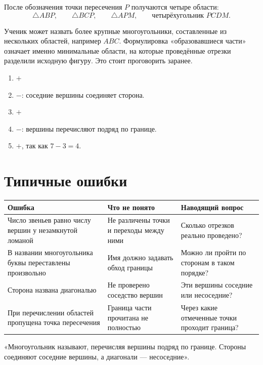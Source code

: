 \begin{thinkbox}
  После обозначения точки пересечения \(P\) получаются четыре области:
  \[
    \triangle ABP,\qquad \triangle BCP,\qquad \triangle APM,
    \qquad \text{четырёхугольник }PCDM.
  \]
\end{thinkbox}

\begin{teacherbox}
  Ученик может назвать более крупные многоугольники, составленные из
  нескольких областей, например \(ABC\). Формулировка «образовавшиеся
  части» означает именно минимальные области, на которые проведённые
  отрезки разделили исходную фигуру. Это стоит проговорить заранее.
\end{teacherbox}

\begin{checkpointbox}
  \begin{enumerate}[label=\alph*),itemsep=0.4em]
    \item \(+\)
    \item \(-\): соседние вершины соединяет сторона.
    \item \(+\)
    \item \(-\): вершины перечисляют подряд по границе.
    \item \(+\), так как \(7-3=4\).
  \end{enumerate}
\end{checkpointbox}

\section{Типичные ошибки}

\begin{center}
  \renewcommand{\arraystretch}{1.42}
  \begin{tabularx}{\textwidth}{
    >{\raggedright\arraybackslash}p{}
    >{\raggedright\arraybackslash}p{}
    >{\raggedright\arraybackslash}X}
    \toprule
    \rowcolor{TableHeader}
    Ошибка & Что не понято & Наводящий вопрос \\
    \midrule
    Число звеньев равно числу вершин у незамкнутой ломаной
      & Не различены точки и переходы между ними
      & Сколько отрезков реально проведено? \\
    \addlinespace[0.2em]
    В названии многоугольника буквы переставлены произвольно
      & Имя должно задавать обход границы
      & Можно ли пройти по сторонам в таком порядке? \\
    \addlinespace[0.2em]
    Сторона названа диагональю
      & Не проверено соседство вершин
      & Эти вершины соседние или несоседние? \\
    \addlinespace[0.2em]
    При перечислении областей пропущена точка пересечения
      & Граница части прочитана не полностью
      & Через какие отмеченные точки проходит граница? \\
    \bottomrule
  \end{tabularx}
\end{center}

\begin{teacherbox}
  «Многоугольник называют, перечисляя вершины подряд по границе. Стороны
  соединяют соседние вершины, а диагонали --- несоседние».
\end{teacherbox}
